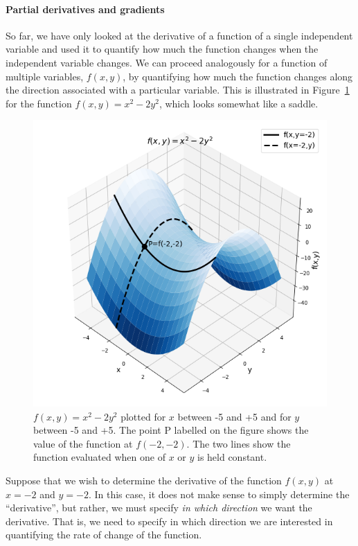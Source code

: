 \paragraph{Partial derivatives and gradients}\label{sec:Calculus:gradients}

So far, we have only looked at the derivative of a function of a single independent variable and used it to quantify how much the function changes when the independent variable changes. We can proceed analogously for a function of multiple variables, $f(x,y)$, by quantifying how much the function changes along the direction associated with a particular variable. This is illustrated in Figure~\ref{fig:Calculus:fxy} for the function $f(x,y)=x^2 -2y^2$, which looks somewhat like a saddle.

\begin{figure}[!htbp]
\centering
\includegraphics[width=0.7\linewidth]{files/fxy-5c7af468668da8d5d9149c8f84a65384.png}
\caption[]{$f(x,y)=x^2 -2y^2$ plotted for $x$ between -5 and +5 and for $y$ between -5 and +5. The point P labelled on the figure shows the value of the function at $f( -2, -2)$. The two lines show the function evaluated when one of $x$ or $y$ is held constant.}
\label{fig:Calculus:fxy}
\end{figure}

Suppose that we wish to determine the derivative of the function $f(x,y)$ at $x= -2$ and $y= -2$. In this case, it does not make sense to simply determine the ``derivative'', but rather, we must specify \textit{in which direction} we want the derivative. That is, we need to specify in which direction we are interested in quantifying the rate of change of the function.

